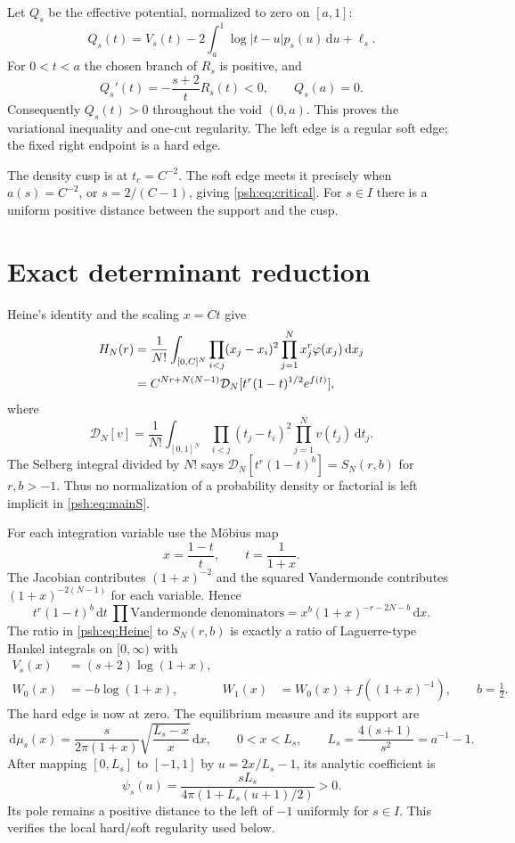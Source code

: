 \documentclass[11pt,a4paper]{article}
\numberwithin{equation}{section}
\theoremstyle{remark}\newtheorem{remark}[theorem]{Remark}
\newcommand{\dd}{\,\mathrm d}
\newcommand{\Dcal}{\mathcal D}
\begin{document}
Let $Q_s$ be the effective potential, normalized to zero on $[a,1]$:
\[
 Q_s(t)=V_s(t)-2\int_a^1\log|t-u|p_s(u)\dd u+\ell_s.
\]
For $0<t<a$ the chosen branch of $R_s$ is positive, and
\begin{equation}\label{psh:eq:voidt}
 Q_s'(t)=-\frac{s+2}{t}R_s(t)<0,\qquad Q_s(a)=0.
\end{equation}
Consequently $Q_s(t)>0$ throughout the void $(0,a)$. This proves the
variational inequality and one-cut regularity. The left edge is a regular
soft edge; the fixed right endpoint is a hard edge.

The density cusp is at $t_c=C^{-2}$. The soft edge meets it precisely when
$a(s)=C^{-2}$, or $s=2/(C-1)$, giving \eqref{psh:eq:critical}. For $s\in I$
there is a uniform positive distance between the support and the cusp.

\section{Exact determinant reduction}\label{psh:sec:reduction}
Heine's identity and the scaling $x=Ct$ give
\begin{align}
 H_N(r)&=\frac1{N!}\int_{[0,C]^N}
           \prod_{i<j}(x_j-x_i)^2\prod_{j=1}^N x_j^r\varphi(x_j)\dd x_j
           \notag\\
 &=C^{Nr+N(N-1)}\Dcal_N[t^r(1-t)^{1/2}e^{f(t)}],\label{psh:eq:Heine}
\end{align}
where
\[
 \Dcal_N[v]=\frac1{N!}\int_{[0,1]^N}
                    \prod_{i<j}(t_j-t_i)^2\prod_{j=1}^N v(t_j)\dd t_j.
\]
The Selberg integral divided by $N!$ says
$\Dcal_N[t^r(1-t)^b]=S_N(r,b)$ for $r,b>-1$.
Thus no normalization of a probability density or factorial is left
implicit in \eqref{psh:eq:mainS}.

For each integration variable use the M\"obius map
\begin{equation}\label{psh:eq:mobius}
 x=\frac{1-t}{t},\qquad t=\frac1{1+x}.
\end{equation}
The Jacobian contributes $(1+x)^{-2}$ and the squared Vandermonde
contributes $(1+x)^{-2(N-1)}$ for each variable. Hence
\[
 t^r(1-t)^b\dd t\ \prod\text{Vandermonde denominators}
   =x^b(1+x)^{-r-2N-b}\dd x.
\]
The ratio in \eqref{psh:eq:Heine} to $S_N(r,b)$ is exactly a ratio of
Laguerre-type Hankel integrals on $[0,\infty)$ with
\begin{align}
 V_s(x)&=(s+2)\log(1+x),\label{psh:eq:Vx}\\
 W_0(x)&=-b\log(1+x),
 &W_1(x)&=W_0(x)+f((1+x)^{-1}),\qquad b=\tfrac12.\label{psh:eq:W}
\end{align}
The hard edge is now at zero. The equilibrium measure and its support are
\begin{equation}\label{psh:eq:mux}
 \dd\mu_s(x)=\frac{s}{2\pi(1+x)}\sqrt{\frac{L_s-x}{x}}\dd x,
 \qquad 0<x<L_s,\qquad L_s=\frac{4(s+1)}{s^2}=a^{-1}-1.
\end{equation}
After mapping $[0,L_s]$ to $[-1,1]$ by $u=2x/L_s-1$, its analytic
coefficient is
\[
 \psi_s(u)=\frac{sL_s}{4\pi(1+L_s(u+1)/2)}>0.
\]
Its pole remains a positive distance to the left of $-1$ uniformly for
$s\in I$. This verifies the local hard/soft regularity used below.
\end{document}
